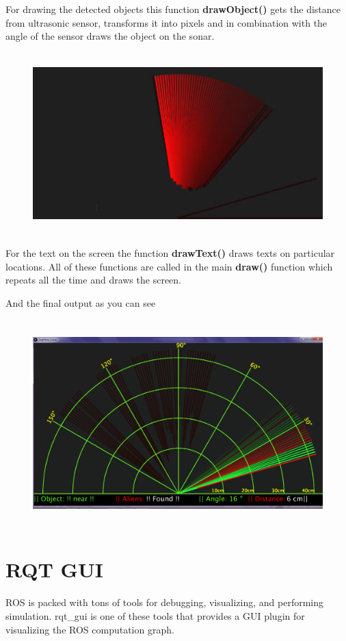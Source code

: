  For drawing the detected objects this function \textbf{drawObject()} gets the distance from ultrasonic sensor, transforms it into pixels and in combination with the angle of the sensor draws the object on the sonar.
\begin{figure}[H]
	\centering
	\includegraphics[width=14cm,height=7cm]{figures/sonar5}
\end{figure}

For the text on the screen the function \textbf{drawText()} draws texts on particular locations. All of these functions are called in the main \textbf{draw()} function which repeats all the time and draws the screen. 

And the final output as you can see 
\begin{figure}[H]
	\centering
	\includegraphics[width=14cm,height=8cm]{figures/sonar6}
\end{figure}

\section{RQT GUI}
ROS is packed with tons of tools for debugging, visualizing, and performing simulation. 
rqt\_gui is one of these tools that provides a GUI plugin for visualizing the ROS computation graph.


